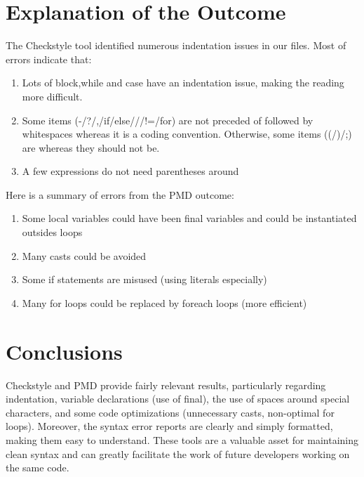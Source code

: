 \documentclass[twocolumn,10pt]{article}
\begin{document}
\section{Explanation of the Outcome}
The Checkstyle tool identified numerous indentation issues in our files. Most of errors indicate that: 
\begin{enumerate}[itemsep=0pt, topsep=0pt, parsep=0pt, partopsep=0pt]
    \item Lots of block,while and case have an indentation issue, making the reading more difficult.
    \item Some items (-/?/,/if/else/{/}/!=/for) are not preceded of followed by whitespaces whereas it is a coding convention. Otherwise, some items ((/)/;) are whereas they should not be.
    \item A few expressions do not need parentheses around 
\end{enumerate}
Here is a summary of errors from the PMD outcome:
\begin{enumerate}[itemsep=0pt, topsep=0pt, parsep=0pt, partopsep=0pt]
    \item Some local variables could have been final variables and could be instantiated outsides loops
    \item Many casts could be avoided 
    \item Some if statements are misused (using literals especially)
    \item Many for loops could be replaced by foreach loops (more efficient)    
\end{enumerate}

\section{Conclusions}
Checkstyle and PMD provide fairly relevant results, particularly regarding indentation, variable declarations (use of final), the use of spaces around special characters, and some code optimizations (unnecessary casts, non-optimal for loops).
Moreover, the syntax error reports are clearly and simply formatted, making them easy to understand. These tools are a valuable asset for maintaining clean syntax and can greatly facilitate the work of future developers working on the same code.

\newpage
\end{document}
